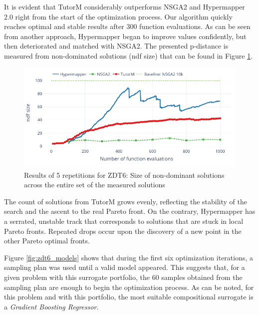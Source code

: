     It is evident that TutorM considerably outperforms NSGA2 and Hypermapper 2.0 right from the start of the optimization process. Our algorithm quickly reaches optimal and stable results after 300 function evaluations. As can be seen from another approach, Hypermapper began to improve values confidently, but then deteriorated and matched with NSGA2. The presented p-distance is measured from non-dominated solutions (ndf size) that can be found in Figure \ref{fig:zdt6_ndf}. 
    
        \begin{figure}[h]
            \centering
            \includegraphics[width=\textwidth]{content/images/zdt6_ndf}
            \caption[Results of 5 repetitions for ZDT6: Size of non-dominant solutions across the entire set of the measured solutions]{Results of 5 repetitions for ZDT6: Size of non-dominant solutions across the entire set of the measured solutions}
            \label{fig:zdt6_ndf}
        \end{figure}
    
    The count of solutions from TutorM grows evenly, reflecting the stability of the search and the ascent to the real Pareto front. On the contrary, Hypermapper has a serrated, unstable track that corresponds to solutions that are stuck in local Pareto fronts. Repeated drops occur upon the discovery of a new point in the other Pareto optimal fronts. 
   
    Figure \ref{fig:zdt6_models} shows that during the first six optimization iterations, a sampling plan was used until a valid model appeared. This suggests that, for a given problem with this surrogate portfolio, the 60 samples obtained from the sampling plan are enough to begin the optimization process. As can be noted, for this problem and with this portfolio, the most suitable compositional surrogate is a \emph{Gradient Boosting Regressor}.  

